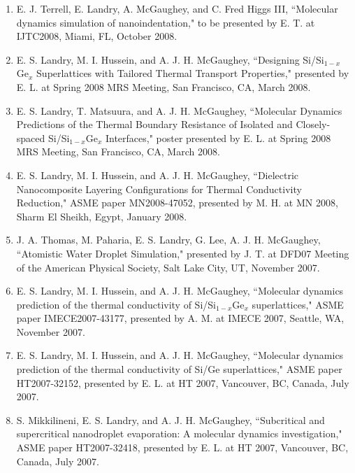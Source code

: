 \documentclass[letterpaper,12pt]{article}
\begin{document}
\begin{enumerate}

\item E. J. Terrell, E. Landry, A. McGaughey, and C. Fred Higgs III,
``Molecular dynamics simulation of nanoindentation," to be presented
by E. T. at IJTC2008, Miami, FL, October 2008.

\item E. S. Landry, M. I. Hussein, and A. J. H. McGaughey,
``Designing Si/Si$_{1-x}$Ge$_x$ Superlattices with Tailored Thermal
Transport Properties," presented by E. L. at Spring 2008 MRS
Meeting, San Francisco, CA, March 2008.

\item E. S. Landry, T. Matsuura, and A. J. H. McGaughey,
``Molecular Dynamics Predictions of the Thermal Boundary Resistance
of Isolated and Closely-spaced Si/Si$_{1-x}$Ge$_x$ Interfaces,"
poster presented by E. L. at Spring 2008 MRS Meeting, San Francisco,
CA, March 2008.

\item E. S. Landry, M. I. Hussein, and A. J. H. McGaughey,
``Dielectric Nanocomposite Layering Configurations for Thermal
Conductivity Reduction," ASME paper MN2008-47052, presented by M. H.
at MN 2008, Sharm El Sheikh, Egypt, January 2008.

\item J. A. Thomas, M. Paharia, E. S. Landry, G. Lee, A. J. H. McGaughey,
``Atomistic Water Droplet Simulation," presented by J. T. at DFD07
Meeting of the American Physical Society, Salt Lake City, UT,
November 2007.

\item E. S. Landry, M. I. Hussein, and A. J. H. McGaughey,
``Molecular dynamics prediction of the thermal conductivity of
Si/Si$_{1-x}$Ge$_x$ superlattices," ASME paper IMECE2007-43177,
presented by A. M. at IMECE 2007, Seattle, WA, November 2007.

\item E. S. Landry, M. I. Hussein, and A. J. H. McGaughey,
``Molecular dynamics prediction of the thermal conductivity of Si/Ge
superlattices," ASME paper HT2007-32152, presented by E. L. at HT
2007, Vancouver, BC, Canada, July 2007.

\item S. Mikkilineni, E. S. Landry, and A. J. H. McGaughey,
``Subcritical and supercritical nanodroplet evaporation: A molecular
dynamics investigation," ASME paper HT2007-32418, presented by E. L.
at HT 2007, Vancouver, BC, Canada, July 2007.


\end{enumerate}
\end{document}
